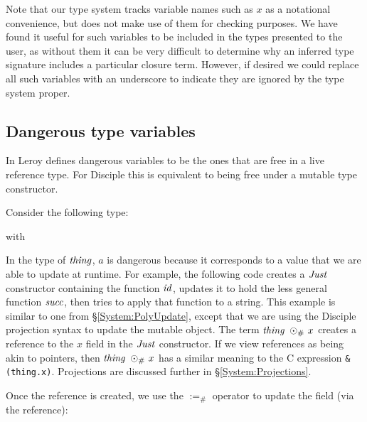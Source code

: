 Note that our type system tracks variable names such as $x$ as a notational convenience, but does not make use of them for checking purposes. We have found it useful for such variables to be included in the types presented to the user, as without them it can be very difficult to determine why an inferred type signature includes a particular closure term. However, if desired we could replace all such variables with an underscore to indicate they are ignored by the type system proper.

\subsection{Dangerous type variables}
\label{System:Closure:dangerous}

In \cite{leroy:polymorphic-typing} Leroy defines dangerous variables to be the ones that are free in a live reference type. For Disciple this is equivalent to being free under a mutable type constructor.

Consider the following type:


\quad with


In the type of $\operatorname{\mathit{thing}}$, $a$ is dangerous because it corresponds to a value that we are able to update at runtime. For example, the following code creates a $\operatorname{\mathit{Just}}$ constructor containing the function $\operatorname{\mathit{id}}$, updates it to hold the less general function $\operatorname{\mathit{succ}}$, then tries to apply that function to a string. This example is similar to one from \S\ref{System:PolyUpdate}, except that we are using the Disciple projection syntax to update the mutable object. The term $\ithing \ \odot_{\#} \ x$ creates a reference to the $x$ field in the $\operatorname{\mathit{Just}}$ constructor. If we view references as being akin to pointers, then $\ithing \ \odot_{\#} \ x$ has a similar meaning to the C expression \texttt{\&(thing.x)}. Projections are discussed further in \S\ref{System:Projections}. 

\clearpage{}
Once the reference is created, we use the $:=_{\#}$ operator to update the field (via the reference):


